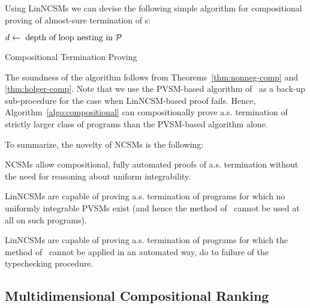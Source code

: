 Using LinNCSMs we can devise the following simple algorithm for compositional proving of almost-sure termination of \APP{}s:

\begin{algorithm}
\DontPrintSemicolon

$d\leftarrow \text{ depth of loop nesting in $\mathcal{P}$}$\;
\caption{Compositional Termination Proving}
\label{algo:compositional}
\end{algorithm}

The soundness of the algorithm follows from Theorems~\ref{thm:nonneg-comp} and 
\ref{thm:holger-comp}. Note that we use the PVSM-based algorithm 
of~\cite{HolgerPOPL} as a back-up sub-procedure for the case when LinNCSM-based 
proof fails. Hence, Algorithm~\ref{algo:compositional} can compositionally 
prove a.s. termination of strictly larger class of programs than the PVSM-based 
algorithm alone.

To summarize, the novelty of NCSMs is the following:
\begin{compactenum}
\item
NCSMs allow compositional, fully automated proofs of a.s. termination without the need for reasoning about uniform integrability.
\item LinNCSMs are capable of proving a.s. termination of programs for which no uniformly integrable PVSMs exist (and hence the method of~\cite{HolgerPOPL} cannot be used at all on such programs).
\item LinNCSMs are capable of proving a.s. termination of programs for which the method of~\cite{HolgerPOPL} cannot be applied in an automated way, do to failure of the typechecking procedure.
\end{compactenum}

\subsection{Multidimensional Compositional Ranking}

